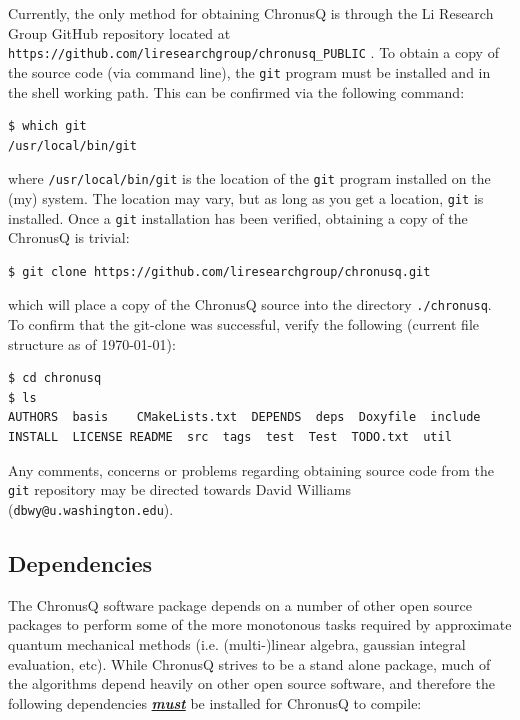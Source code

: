 \documentclass[12pt]{article}
\begin{document}
Currently, the only method for obtaining ChronusQ is through the Li Research Group GitHub repository located
at \texttt{https://github.com/liresearchgroup/chronusq\_PUBLIC} . To obtain a copy of the source code (via command line), the \texttt{git} program must be installed and in the shell working path. This can be confirmed via the following command:

\begin{lstlisting}
$ which git
/usr/local/bin/git
\end{lstlisting}
where \texttt{/usr/local/bin/git} is the location of the \texttt{git} program installed on the (my) system. The location may vary, but as long as you get a location, \texttt{git} is installed. Once a \texttt{git} installation has been verified, obtaining a copy of the ChronusQ is trivial:

\begin{lstlisting}
$ git clone https://github.com/liresearchgroup/chronusq.git
\end{lstlisting}
which will place a copy of the ChronusQ source into the directory \texttt{./chronusq}. To confirm that the git-clone was successful, verify the following (current file structure as of \today):

\begin{lstlisting}
$ cd chronusq
$ ls
AUTHORS  basis    CMakeLists.txt  DEPENDS  deps  Doxyfile  include  
INSTALL  LICENSE README  src  tags  test  Test  TODO.txt  util
\end{lstlisting}
Any comments, concerns or problems regarding obtaining source code from the \texttt{git} repository may be directed towards David Williams (\texttt{dbwy@u.washington.edu}).

\subsection{Dependencies} \label{subsec:deps}

The ChronusQ software package depends on a number of other open source packages to perform some of the more monotonous tasks required by approximate quantum mechanical methods (i.e. (multi-)linear algebra, gaussian integral evaluation, etc). While ChronusQ strives to be a stand alone package, much of the algorithms depend heavily on other open source software, and therefore the following dependencies \textbf{\textit{\underline{must}}} be installed for ChronusQ to compile:
\end{document}
